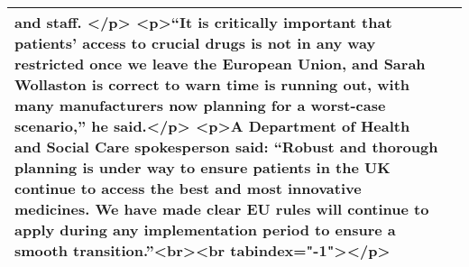 \documentclass[]{article}
\begin{document}
\begin{table}[!h]
{\begin{tabular}[t]{ll}
and staff. </p> <p>“It is critically important that patients’ access to crucial drugs is not in any way restricted once we leave the European Union, and Sarah Wollaston is correct to warn time is running out, with many manufacturers now planning for a worst-case scenario,” he said.</p> <p>A Department of Health and Social Care spokesperson said: “Robust and thorough planning is under way to ensure patients in the UK continue to access the best and most innovative medicines. We have made clear EU rules will continue to apply during any implementation period to ensure a smooth transition.”<br><br tabindex="-1"></p>\\
\bottomrule
\end{tabular}}
\end{table}


\end{document}
